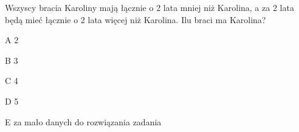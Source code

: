 \begin{tresc}
Wszyscy bracia Karoliny mają łącznie o 2 lata mniej niż Karolina, a za 2 lata będą mieć łącznie o 2 lata więcej niż Karolina. Ilu braci ma Karolina?
\end{tresc}
\begin{wariant}{A} 2 \end{wariant}
\begin{wariant}{B} 3 \end{wariant}
\begin{wariant}{C} 4 \end{wariant}
\begin{wariant}{D} 5 \end{wariant}
\begin{wariant}{E} za mało danych do rozwiązania zadania \end{wariant}
